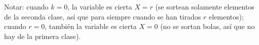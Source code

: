
Notar: cuando  $k =  0$, la  variable es cierta  $X =  r$ (se  sortean solamente
elementos de la seconda clase, as\'i  que para siempre cuando se han tirados $r$
elementos); cuando  $r =  0$, tambi\'en  la variable es  cierta $X  = 0$  (no se
sortan bolas, as\'i que no hay de la primera clase).

